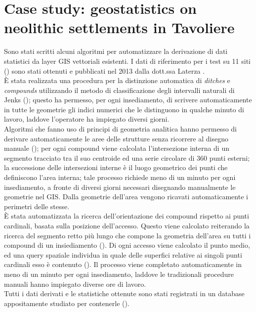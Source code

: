 \chapter{Case study: geostatistics on neolithic settlements in Tavoliere}

    \begin{chaptersum}
        Sono stati scritti alcuni algoritmi per automatizzare la derivazione di dati statistici da layer GIS vettoriali esistenti. I dati di riferimento per i test su 11 siti () sono stati ottenuti e pubblicati nel 2013 dalla dott.ssa Laterza \cite{laterza}.\\
        È stata realizzata una procedura per la distinzione automatica di \emph{ditches} e \emph{compounds} utilizzando il metodo di classificazione degli intervalli naturali di Jenks (); questo ha permesso, per ogni insediamento, di scrivere automaticamente in tutte le geometrie gli indici numerici che le distinguono in qualche minuto di lavoro, laddove l'operatore ha impiegato diversi giorni.\\
        Algoritmi che fanno uso di principi di geometria analitica hanno permesso di derivare automaticamente le aree delle strutture senza ricorrere al disegno manuale (); per ogni compound viene calcolata l'intersezione interna di un segmento tracciato tra il suo centroide ed una serie circolare di 360 punti esterni; la successione delle intersezioni interne è il luogo geometrico dei punti che definiscono l'area interna; tale processo richiede meno di un minuto per ogni insediamento, a fronte di diversi giorni necessari disegnando manualmente le geometrie nel GIS. Dalla geometrie dell'area vengono ricavati automaticamente i perimetri delle stesse.\\
        È stata automatizzata la ricerca dell'orientazione dei compound rispetto ai punti cardinali, basata sulla posizione dell'accesso. Questo viene calcolato reiterando la ricerca del segmento retto più lungo che compone la geometria dell'area su tutti i compound di un insiediamento (). Di ogni accesso viene calcolato il punto medio, ed una query spaziale individua in quale delle superfici relative ai singoli punti cardinali esso è contenuto (). Il processo viene completato automaticamente in meno di un minuto per ogni insediamento, laddove le tradizionali procedure manuali hanno impiegato diverse ore di lavoro.\\
        Tutti i dati derivati e le statistiche ottenute sono stati registrati in un database appositamente studiato per contenerle ().
    \end{chaptersum}

